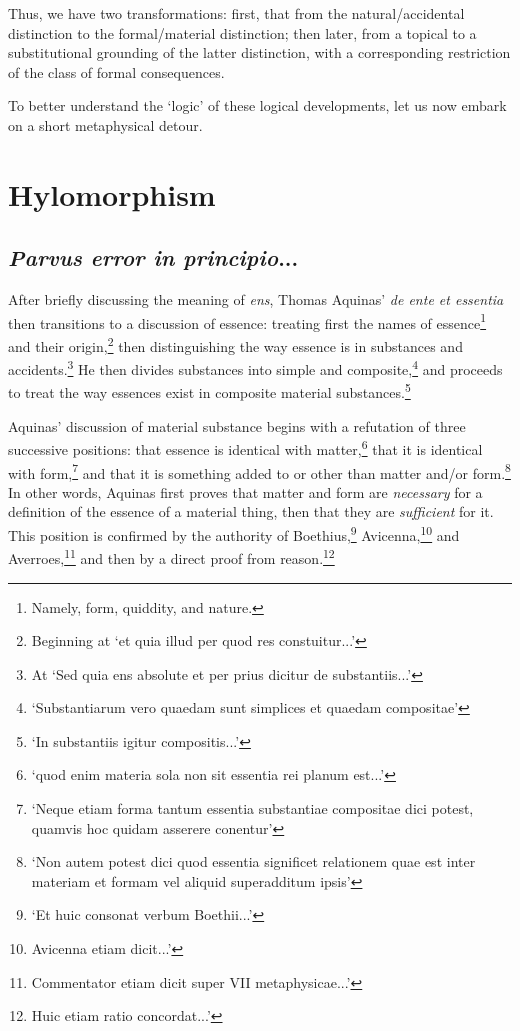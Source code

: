 \documentclass[]{article}
\begin{document}
Thus, we have two transformations: first, that from the natural/accidental distinction to the formal/material distinction; then later, from a topical to a substitutional grounding of the latter distinction, with a corresponding restriction of the class of formal consequences.

To better understand the `logic' of these logical developments, let us now embark on a short metaphysical detour.
\section{Hylomorphism}
\subsection{\textit{Parvus error in principio}...}
After briefly discussing the meaning of \textit{ens},\autocite{AquinasDEE} Thomas Aquinas' \textit{de ente et essentia} then transitions to a discussion of essence:  treating first the names of essence\footnote{Namely, form, quiddity, and nature.} and their origin,\footnote{Beginning at `et quia illud per quod res constuitur...'}  then distinguishing the way essence is in substances and accidents.\footnote{At `Sed quia ens absolute et per prius dicitur de substantiis...'}  He then divides substances into simple and composite,\footnote{`Substantiarum vero quaedam sunt simplices et quaedam compositae'}  and proceeds to treat the way essences exist in composite material substances.\footnote{`In substantiis igitur compositis...'}
	
Aquinas' discussion of material substance begins with a refutation of three successive positions: that essence is identical with matter,\footnote{`quod enim materia sola non sit essentia rei planum est...'}  that it is identical with form,\footnote{`Neque etiam forma tantum essentia substantiae compositae dici potest, quamvis hoc quidam asserere conentur'}  and that it is something added to or other than matter and/or form.\footnote{`Non autem potest dici quod essentia significet relationem quae est inter materiam et formam vel aliquid superadditum ipsis'}  In other words, Aquinas first proves that matter and form are \textit{necessary} for a definition of the essence of a material thing, then that they are \textit{sufficient} for it. This position is confirmed by the authority of Boethius,\footnote{`Et huic consonat verbum Boethii...'}  Avicenna,\footnote{Avicenna etiam dicit...'}  and Averroes,\footnote{Commentator etiam dicit super VII metaphysicae...'}  and then by a direct proof from reason.\footnote{Huic etiam ratio concordat...'}
\end{document}
